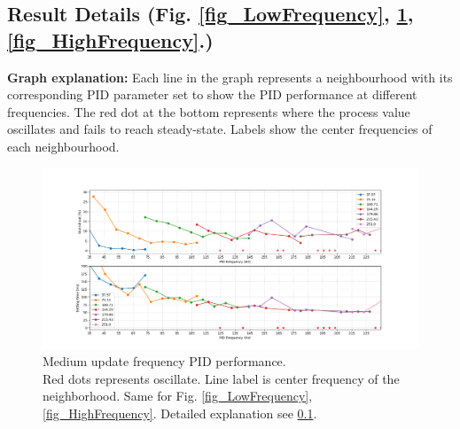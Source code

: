 \documentclass[conference]{IEEEtran}
\begin{document}
\subsection{Result Details (Fig. \ref{fig_LowFrequency}, \ref{fig_MediumFrequency}, \ref{fig_HighFrequency}.) } 
\label{Result Details}
    \textbf{Graph explanation:} Each line in the graph represents a neighbourhood with its corresponding PID parameter set to show the PID performance at different frequencies. The red dot at the bottom represents where the process value oscillates and fails to reach steady-state. Labels show the center frequencies of each neighbourhood.
        \begin{figure}
            \centerline{\includegraphics[width=1.2\linewidth]{Report/Pic/ResultMediumFrequency_2.png}}
            \caption{Medium update frequency PID performance. \protect\\ Red dots represents oscillate. Line label is center frequency of the neighborhood. Same for Fig. \ref{fig_LowFrequency}, \ref{fig_HighFrequency}. Detailed explanation see \ref{Result Details}.}
            \label{fig_MediumFrequency}
        \end{figure}
\end{document}

